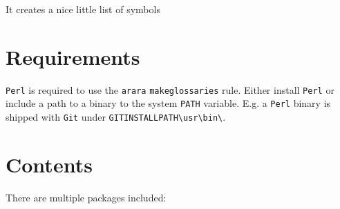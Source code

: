 \documentclass[%
  type=article,%
  layout=koma,%
  hyperref=true,%
  conditionallox=true,%
  conditionalloxnewpage=false,%
  date=true,%
  index=true,%
  listings=true%
]{stmtext}
\begin{document}
It creates a nice little list of symbols

\glstocfalse
\printglossary[type=example1list  ,style=stmsymbolstyle  ,nonumberlist]
\glstoctrue

% 

\section{Requirements}
\label{sec:requirements}

\texttt{Perl} is required to use the \texttt{arara} \texttt{makeglossaries} rule. Either install \texttt{Perl} or include a path to a binary to the system \texttt{PATH} variable. E.g. a \texttt{Perl} binary is shipped with \texttt{Git} under \texttt{GITINSTALLPATH\textbackslash usr\textbackslash bin\textbackslash}.

\section{Contents}
\label{sec:contents}

There are multiple packages included:
\end{document}
